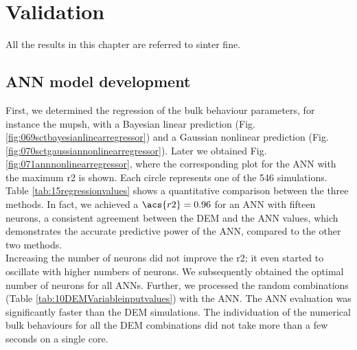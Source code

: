 
\chapter{Validation}
\label{cap:validation}

All the results in this chapter are referred to sinter fine.

\section{ANN model development}
\label{sec:annmodeldev}



First, we determined the regression of the bulk behaviour parameters, for
instance the \acs{mupsh}, 
with a Bayesian linear prediction (Fig.
\ref{fig:069sctbayesianlinearregressor}) and a Gaussian nonlinear prediction
(Fig.  \ref{fig:070sctgaussiannonlinearregressor}). 
Later we obtained Fig.
\ref{fig:071annnonlinearregressor}, where the corresponding plot for the \acs{ANN} with the maximum \acs{r2} is shown. 
Each circle represents one of the 546 simulations.
Table \ref{tab:15regressionvalues} shows a quantitative comparison between the
three methods. 
In fact, 
we achieved a $\acs{r2} = 0.96$ for an \acs{ANN} with fifteen neurons,
a consistent agreement between the 
\acs{DEM} and the \acs{ANN} values, which demonstrates the accurate predictive power of
the \acs{ANN}, compared to the other two methods.\\ 
Increasing the number of neurons did not improve the \acs{r2}; it even started to
oscillate with higher numbers of neurons.
We subsequently obtained the optimal number of neurons for all \acs{ANNs}.
Further, we processed the random combinations (Table
\ref{tab:10DEMVariableinputvalues}) with the \acs{ANN}.
The \acs{ANN} evaluation was significantly faster than the \acs{DEM} simulations. The
individuation of the numerical bulk behaviours for all the \acs{DEM} combinations
did not take more than a few seconds on a single core.



  

